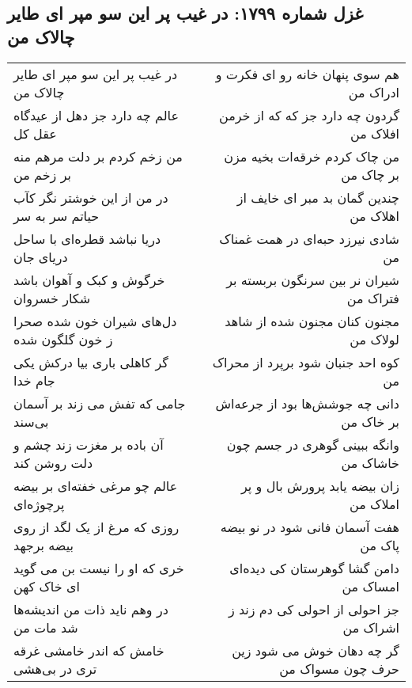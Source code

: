 \begin{center}
\section*{غزل شماره ۱۷۹۹: در غیب پر این سو مپر ای طایر چالاک من}
\label{sec:1799}
\begin{longtable}{l p{0.5cm} r}
در غیب پر این سو مپر ای طایر چالاک من
&&
هم سوی پنهان خانه رو ای فکرت و ادراک من
\\
عالم چه دارد جز دهل از عیدگاه عقل کل
&&
گردون چه دارد جز که که از خرمن افلاک من
\\
من زخم کردم بر دلت مرهم منه بر زخم من
&&
من چاک کردم خرقه‌ات بخیه مزن بر چاک من
\\
در من از این خوشتر نگر کآب حیاتم سر به سر
&&
چندین گمان بد مبر ای خایف از اهلاک من
\\
دریا نباشد قطره‌ای با ساحل دریای جان
&&
شادی نیرزد حبه‌ای در همت غمناک من
\\
خرگوش و کبک و آهوان باشد شکار خسروان
&&
شیران نر بین سرنگون بربسته بر فتراک من
\\
دل‌های شیران خون شده صحرا ز خون گلگون شده
&&
مجنون کنان مجنون شده از شاهد لولاک من
\\
گر کاهلی باری بیا درکش یکی جام خدا
&&
کوه احد جنبان شود برپرد از محراک من
\\
جامی که تفش می زند بر آسمان بی‌سند
&&
دانی چه جوشش‌ها بود از جرعه‌اش بر خاک من
\\
آن باده بر مغزت زند چشم و دلت روشن کند
&&
وانگه ببینی گوهری در جسم چون خاشاک من
\\
عالم چو مرغی خفته‌ای بر بیضه پرچوژه‌ای
&&
زان بیضه یابد پرورش بال و پر املاک من
\\
روزی که مرغ از یک لگد از روی بیضه برجهد
&&
هفت آسمان فانی شود در نو بیضه پاک من
\\
خری که او را نیست بن می گوید ای خاک کهن
&&
دامن گشا گوهرستان کی دیده‌ای امساک من
\\
در وهم ناید ذات من اندیشه‌ها شد مات من
&&
جز احولی از احولی کی دم زند ز اشراک من
\\
خامش که اندر خامشی غرقه تری در بی‌هشی
&&
گر چه دهان خوش می شود زین حرف چون مسواک من
\\
\end{longtable}
\end{center}
